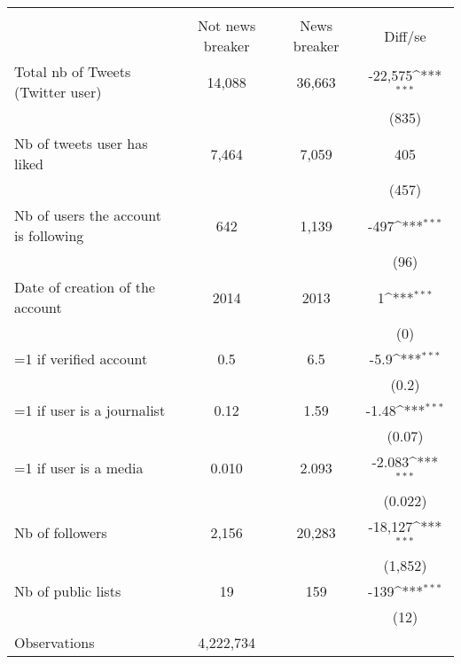 {
\def\sym#1{\ifmmode^{#1}\else\(^{#1}\)\fi}
\begin{tabular}{l*{1}{ccc}}
\hline\hline
                    &\multicolumn{3}{c}{ }                          \\
                    &Not news breaker&News breaker&     Diff/se         \\
\hline
Total nb of Tweets (Twitter user)&      14,088&      36,663&     -22,575\sym{***}\\
                    &            &            &       (835)         \\
Nb of tweets user has liked&       7,464&       7,059&         405         \\
                    &            &            &       (457)         \\
Nb of users the account is following&         642&       1,139&        -497\sym{***}\\
                    &            &            &        (96)         \\
Date of creation of the account&        2014&        2013&           1\sym{***}\\
                    &            &            &         (0)         \\
=1 if verified account&         0.5&         6.5&        -5.9\sym{***}\\
                    &            &            &       (0.2)         \\
=1 if user is a journalist&        0.12&        1.59&       -1.48\sym{***}\\
                    &            &            &      (0.07)         \\
=1 if user is a media&       0.010&       2.093&      -2.083\sym{***}\\
                    &            &            &     (0.022)         \\
Nb of followers     &       2,156&      20,283&     -18,127\sym{***}\\
                    &            &            &     (1,852)         \\
Nb of public lists  &          19&         159&        -139\sym{***}\\
                    &            &            &        (12)         \\
\hline
Observations        &   4,222,734&            &                     \\
\hline\hline
\end{tabular}
}
